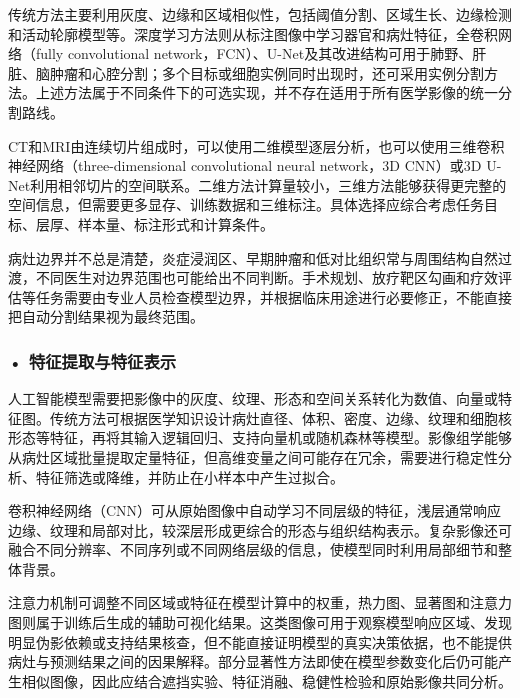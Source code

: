 传统方法主要利用灰度、边缘和区域相似性，包括阈值分割、区域生长、边缘检测和活动轮廓模型等。深度学习方法则从标注图像中学习器官和病灶特征，全卷积网络（fully convolutional network，FCN）、U-Net及其改进结构可用于肺野、肝脏、脑肿瘤和心腔分割；多个目标或细胞实例同时出现时，还可采用实例分割方法。上述方法属于不同条件下的可选实现，并不存在适用于所有医学影像的统一分割路线。

CT和MRI由连续切片组成时，可以使用二维模型逐层分析，也可以使用三维卷积神经网络（three-dimensional convolutional neural network，3D CNN）或3D U-Net利用相邻切片的空间联系。二维方法计算量较小，三维方法能够获得更完整的空间信息，但需要更多显存、训练数据和三维标注。具体选择应综合考虑任务目标、层厚、样本量、标注形式和计算条件。

病灶边界并不总是清楚，炎症浸润区、早期肿瘤和低对比组织常与周围结构自然过渡，不同医生对边界范围也可能给出不同判断。手术规划、放疗靶区勾画和疗效评估等任务需要由专业人员检查模型边界，并根据临床用途进行必要修正，不能直接把自动分割结果视为最终范围。

\subsubsection*{\textbf{• 特征提取与特征表示}}

人工智能模型需要把影像中的灰度、纹理、形态和空间关系转化为数值、向量或特征图。传统方法可根据医学知识设计病灶直径、体积、密度、边缘、纹理和细胞核形态等特征，再将其输入逻辑回归、支持向量机或随机森林等模型。影像组学能够从病灶区域批量提取定量特征，但高维变量之间可能存在冗余，需要进行稳定性分析、特征筛选或降维，并防止在小样本中产生过拟合。

卷积神经网络（CNN）可从原始图像中自动学习不同层级的特征，浅层通常响应边缘、纹理和局部对比，较深层形成更综合的形态与组织结构表示。复杂影像还可融合不同分辨率、不同序列或不同网络层级的信息，使模型同时利用局部细节和整体背景。

注意力机制可调整不同区域或特征在模型计算中的权重，热力图、显著图和注意力图则属于训练后生成的辅助可视化结果。这类图像可用于观察模型响应区域、发现明显伪影依赖或支持结果核查，但不能直接证明模型的真实决策依据，也不能提供病灶与预测结果之间的因果解释。部分显著性方法即使在模型参数变化后仍可能产生相似图像，因此应结合遮挡实验、特征消融、稳健性检验和原始影像共同分析\label{note:ch9-saliency}。

